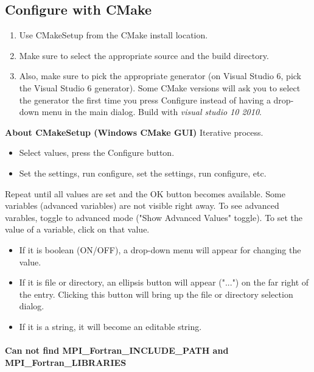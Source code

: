 \subsection{Configure with CMake}
\begin{enumerate}
\item Use CMakeSetup from the CMake install location.
\item Make sure to select the appropriate source and the build directory.
\item Also, make sure to pick the appropriate generator (on Visual Studio 6, pick the Visual Studio 6 generator).
Some CMake versions will ask you to select the generator the first time you press Configure instead of having a drop-down menu in the main dialog.
Build with \emph{visual studio 10 2010}. \end{enumerate}
{\bf About CMakeSetup (Windows CMake GUI)}
Iterative process. \begin{itemize}\item  Select values, press the Configure button.
\item Set the settings, run configure, set the settings, run configure, etc.\end{itemize}

Repeat until all values are set and the OK button becomes available.
Some variables (advanced variables) are not visible right away.
To see advanced varables, toggle to advanced mode ("Show Advanced Values" toggle).
To set the value of a variable, click on that value. \begin{itemize}
\item If it is boolean (ON/OFF), a drop-down menu will appear for changing the value.
\item If it is file or directory, an ellipsis button will appear ("...") on the far right of the entry. Clicking this button will bring up the file or directory selection dialog.
\item If it is a string, it will become an editable string. \end{itemize}

\paragraph{Can not find MPI\_Fortran\_INCLUDE\_PATH and MPI\_Fortran\_LIBRARIES} 
